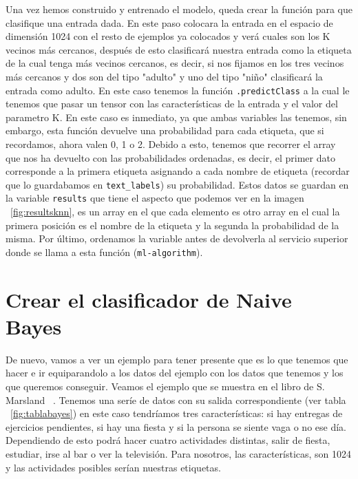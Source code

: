 \documentclass[a4paper, 12pt]{book}
\begin{document}
Una vez hemos construido y entrenado el modelo, queda crear la función para que clasifique una entrada dada. En este paso colocara la entrada en el espacio de dimensión 1024 con el resto de ejemplos ya colocados y verá cuales son los K vecinos más cercanos, después de esto clasificará nuestra entrada como la etiqueta de la cual tenga más vecinos cercanos, es decir, si nos fijamos en los tres vecinos más cercanos y dos son del tipo "adulto" y uno del tipo "niño" clasificará la entrada como adulto. En este caso tenemos la función \texttt{.predictClass} a la cual le tenemos que pasar un tensor con las características de la entrada y el valor del parametro K. En este caso es inmediato, ya que ambas variables las tenemos, sin embargo, esta función devuelve una probabilidad para cada etiqueta, que si recordamos, ahora valen 0, 1 o 2. Debido a esto, tenemos que recorrer el array que nos ha devuelto con las probabilidades ordenadas, es decir, el primer dato corresponde a la primera etiqueta asignando a cada nombre de etiqueta (recordar que lo guardabamos en \texttt{text\_labels}) su probabilidad. Estos datos se guardan en la variable \texttt{results} que tiene el aspecto que podemos ver en la imagen ~\ref{fig:resultsknn}, es un array en el que cada elemento es otro array en el cual la primera posición es el nombre de la etiqueta y la segunda la probabilidad de la misma. Por último, ordenamos la variable antes de devolverla al servicio superior donde se llama a esta función (\texttt{ml-algorithm}).

\section{Crear el clasificador de Naive Bayes} 
\label{sec:naivebayes}

De nuevo, vamos a ver un ejemplo para tener presente que es lo que tenemos que hacer e ir equiparandolo a los datos del ejemplo con los datos que tenemos y los que queremos conseguir. Veamos el ejemplo que se muestra en el libro de S. Marsland ~\cite{machinelearning}. Tenemos una seríe de datos con su salida correspondiente (ver tabla ~\ref{fig:tablabayes}) en este caso tendríamos tres características: si hay entregas de ejercicios pendientes, si hay una fiesta y si la persona se siente vaga o no ese día. Dependiendo de esto podrá hacer cuatro actividades distintas, salir de fiesta, estudiar, irse al bar o ver la televisión. Para nosotros, las características, son 1024 y las actividades posibles serían nuestras etiquetas. 
\end{document}
